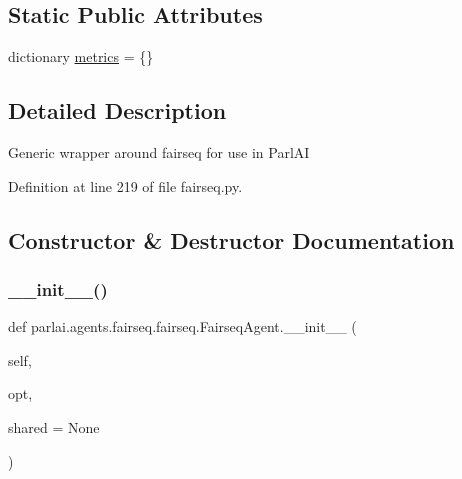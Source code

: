 \subsection*{Static Public Attributes}
\begin{DoxyCompactItemize}
\item 
dictionary \hyperlink{classparlai_1_1agents_1_1fairseq_1_1fairseq_1_1FairseqAgent_a5e71f6ef265d5463a4fb1e561853edd6}{metrics} = \{\}
\end{DoxyCompactItemize}


\subsection{Detailed Description}
\begin{DoxyVerb}Generic wrapper around fairseq for use in ParlAI\end{DoxyVerb}
 

Definition at line 219 of file fairseq.\+py.



\subsection{Constructor \& Destructor Documentation}
\mbox{\label{classparlai_1_1agents_1_1fairseq_1_1fairseq_1_1FairseqAgent_ac203ba228e9e3dd20568b986ef600a62}} 
\subsubsection{\texorpdfstring{\+\_\+\+\_\+init\+\_\+\+\_\+()}{\_\_init\_\_()}}
{\footnotesize\ttfamily def parlai.\+agents.\+fairseq.\+fairseq.\+Fairseq\+Agent.\+\_\+\+\_\+init\+\_\+\+\_\+ (\begin{DoxyParamCaption}\item[{}]{self,  }\item[{}]{opt,  }\item[{}]{shared = {\ttfamily None} }\end{DoxyParamCaption})}




